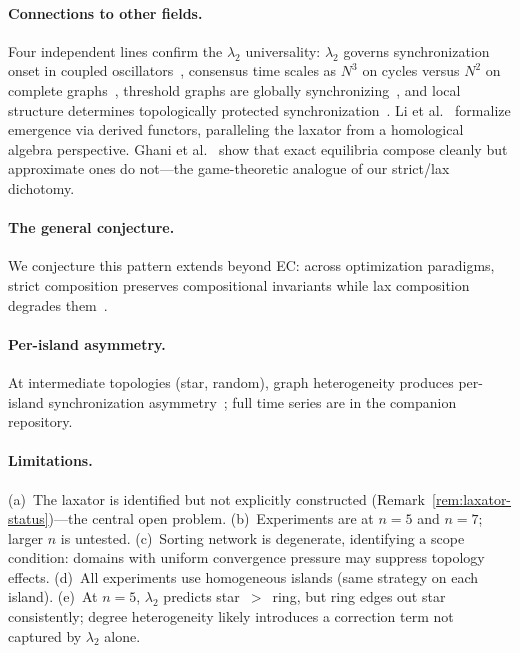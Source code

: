 \documentclass[submission,copyright,creativecommons]{eptcs}
\begin{document}
\paragraph{Connections to other fields.}
Four independent lines confirm the $\lambda_2$ universality:
$\lambda_2$ governs synchronization onset in coupled
oscillators~\cite{sanz2026algebraic}, consensus time scales as
$N^3$ on cycles versus $N^2$ on complete
graphs~\cite{brewster2025diversity}, threshold graphs are globally
synchronizing~\cite{wu2025threshold}, and local structure determines
topologically protected
synchronization~\cite{ostilli2025topological}. Li et
al.~\cite{li2023emergence} formalize emergence via derived functors,
paralleling the laxator from a homological algebra perspective.
Ghani et al.~\cite{ghani2025approximate} show that exact equilibria
compose cleanly but approximate ones do not---the game-theoretic
analogue of our strict/lax dichotomy.

\paragraph{The general conjecture.}
We conjecture this pattern extends beyond EC: across optimization
paradigms, strict composition preserves compositional invariants while
lax composition degrades
them~\cite{chen2025scaling,kumar2026constitutional,
alphaevolve2026marl,alpay2025semantic,assumpcao2025codeevolve,
sanz2026algebraic,han2026conformity}.

\paragraph{Per-island asymmetry.}
At intermediate topologies (star, random), graph heterogeneity
produces per-island synchronization
asymmetry~\cite{zhou2026defect}; full time series are in the
companion repository.

\paragraph{Limitations.}
(a)~The laxator is identified but not explicitly constructed
(Remark~\ref{rem:laxator-status})---the central open problem.
(b)~Experiments are at $n{=}5$ and $n{=}7$; larger $n$ is
untested.
(c)~Sorting network is degenerate, identifying a scope condition:
domains with uniform convergence pressure may suppress topology
effects.
(d)~All experiments use homogeneous islands (same strategy on each
island).
(e)~At $n{=}5$, $\lambda_2$ predicts star~$>$~ring, but ring
edges out star consistently; degree heterogeneity likely introduces
a correction term not captured by $\lambda_2$ alone.
\end{document}
